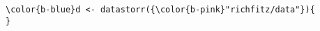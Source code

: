 \documentclass[class=minimal,border=0]{standalone}
\begin{document}
%
\begin{BVerbatim}[bgcolor=b-darkgrey]
\color{b-blue}d <- datastorr({\color{b-pink}"richfitz/data"}){          }
\end{BVerbatim}
\end{document}
